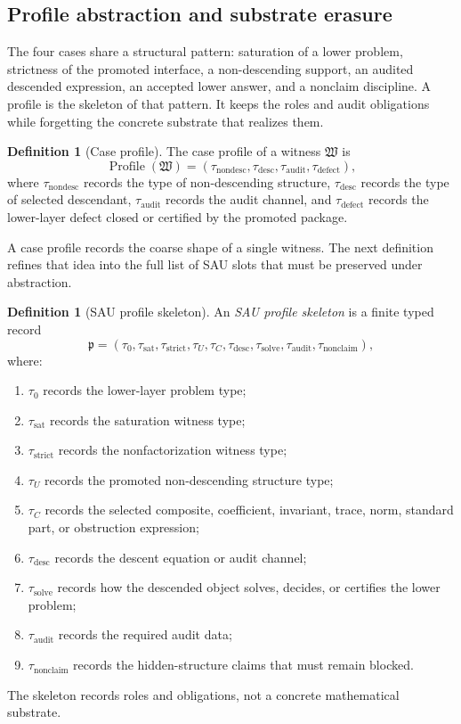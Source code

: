 \documentclass[11pt]{article}
\newcommand{\Prof}{\operatorname{Profile}}
\theoremstyle{definition}
\newtheorem{definition}[theorem]{Definition}
\begin{document}
\subsection{Profile abstraction and substrate erasure}
\label{subsec:transfer-profile-abstraction}

The four cases share a structural pattern: saturation of a lower problem,
strictness of the promoted interface, a non-descending support, an audited
descended expression, an accepted lower answer, and a nonclaim discipline.  A
profile is the skeleton of that pattern.  It keeps the roles and audit
obligations while forgetting the concrete substrate that realizes them.

\begin{definition}[Case profile]
\label{def:sau-case-profile}
The case profile of a witness \(\mathfrak W\) is
\[
\Prof(\mathfrak W)
=(\tau_{\mathrm{nondesc}},\tau_{\mathrm{desc}},\tau_{\mathrm{audit}},\tau_{\mathrm{defect}}),
\]
where \(\tau_{\mathrm{nondesc}}\) records the type of non-descending structure, \(\tau_{\mathrm{desc}}\) records the type of selected descendant, \(\tau_{\mathrm{audit}}\) records the audit channel, and \(\tau_{\mathrm{defect}}\) records the lower-layer defect closed or certified by the promoted package.
\end{definition}

A case profile records the coarse shape of a single witness.  The next
definition refines that idea into the full list of SAU slots that must be
preserved under abstraction.

\begin{definition}[SAU profile skeleton]
\label{def:sau-profile-skeleton}
An \emph{SAU profile skeleton} is a finite typed record
\[
\mathfrak p=
(\tau_{0},\tau_{\mathrm{sat}},\tau_{\mathrm{strict}},
\tau_{U},\tau_{C},\tau_{\mathrm{desc}},\tau_{\mathrm{solve}},
\tau_{\mathrm{audit}},\tau_{\mathrm{nonclaim}}),
\]
where:
\begin{enumerate}
\item \(\tau_0\) records the lower-layer problem type;
\item \(\tau_{\mathrm{sat}}\) records the saturation witness type;
\item \(\tau_{\mathrm{strict}}\) records the nonfactorization witness type;
\item \(\tau_U\) records the promoted non-descending structure type;
\item \(\tau_C\) records the selected composite, coefficient, invariant, trace, norm, standard part, or obstruction expression;
\item \(\tau_{\mathrm{desc}}\) records the descent equation or audit channel;
\item \(\tau_{\mathrm{solve}}\) records how the descended object solves, decides, or certifies the lower problem;
\item \(\tau_{\mathrm{audit}}\) records the required audit data;
\item \(\tau_{\mathrm{nonclaim}}\) records the hidden-structure claims that must remain blocked.
\end{enumerate}
The skeleton records roles and obligations, not a concrete mathematical substrate.
\end{definition}
\end{document}
